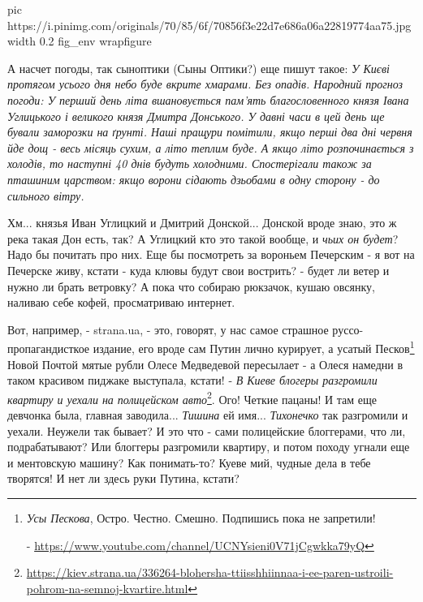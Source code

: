 \ifcmt
  pic https://i.pinimg.com/originals/70/85/6f/70856f3e22d7e686a06a22819774aa75.jpg
  width 0.2
  fig_env wrapfigure
\fi

А насчет погоды, так сыноптики (Сыны Оптики?) еще пишут такое: \emph{У Києві
протягом усього дня небо буде вкрите хмарами.  Без опадів. Народний прогноз
погоди: У перший день літа вшановується пам'ять благословенного князя Івана
Углицького і великого князя Дмитра Донського. У давні часи в цей день ще бували
заморозки на ґрунті.  Наші пращури помітили, якщо перші два дні червня йде дощ
- весь місяць сухим, а літо теплим буде. А якщо літо розпочинається з холодів,
то наступні 40 днів будуть холодними.  Спостерігали також за пташиним царством:
якщо ворони сідають дзьобами в одну сторону - до сильного вітру.}

Хм... князья Иван Углицкий и Дмитрий Донской... Донской вроде знаю, это ж река
такая Дон есть, так? А Углицкий кто это такой вообще, и \emph{чьих он будет}?
Надо бы почитать про них. Еще бы посмотреть за вороньем Печерским - я вот на
Печерске живу, кстати - куда клювы будут свои вострить? - будет ли ветер и
нужно ли брать ветровку?  А пока что собираю рюкзачок, кушаю овсянку, наливаю
себе кофей, просматриваю интернет. 


Вот, например, - strana.ua, - это, говорят, у нас самое страшное
руссо-пропагандисткое издание, его вроде сам Путин лично курирует, а усатый
Песков\footnote{\emph{Усы Пескова}, Остро. Честно. Смешно. Подпишись пока не
запретили!\par - \url{https://www.youtube.com/channel/UCNYsieni0V71jCgwkka79yQ}}
Новой Почтой мятые рубли Олесе Медведевой пересылает - а Олеся намедни в таком
красивом пиджаке выступала, кстати! - \emph{В Киеве блогеры разгромили квартиру
и уехали на полицейском
авто}\footnote{\url{https://kiev.strana.ua/336264-blohersha-ttiisshhiinnaa-i-ee-paren-ustroili-pohrom-na-semnoj-kvartire.html}}.
Ого! Четкие пацаны! И там еще девчонка была, главная заводила... \emph{Тишина}
ей имя... \emph{Тихонечко} так разгромили и уехали. Неужели так бывает? И это
что - сами полицейские блоггерами, что ли, подрабатывают? Или блоггеры
разгромили квартиру, и потом походу угнали еще и ментовскую машину? Как
понимать-то? Куеве мий, чудные дела в тебе творятся!  И нет ли здесь руки
Путина, кстати? 


